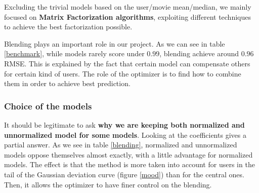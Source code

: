 \documentclass[10pt,conference,compsocconf]{IEEEtran}
\begin{document}
Excluding the trivial models based on the user/movie mean/median, we mainly focused on \textbf{Matrix
Factorization algorithms}, exploiting different techniques to achieve the best factorization
possible. 

Blending plays an important role in our project. As we can see in table \ref{benchmark}, while models rarely score under $0.99$, blending achieve around $0.96$ RMSE. This is explained by the fact that certain model can compensate others for certain kind of users. The role of the optimizer is to find how to combine them in order to achieve best prediction.


\subsubsection{Choice of the models}
\label{choice_model}

It should be legitimate to ask \textbf{why we are keeping both normalized and unnormalized model for
some models}. Looking at the coefficients gives a partial answer. As we see in table \ref{blending}, normalized and unnormalized models oppose themselves almost exactly, with a little advantage for normalized models. The effect is that the method is more taken into account for users in the tail of the Gaussian deviation curve (figure \ref{mood}) than for the central ones. Then, it allows the optimizer to have finer control on the blending.
\end{document}
